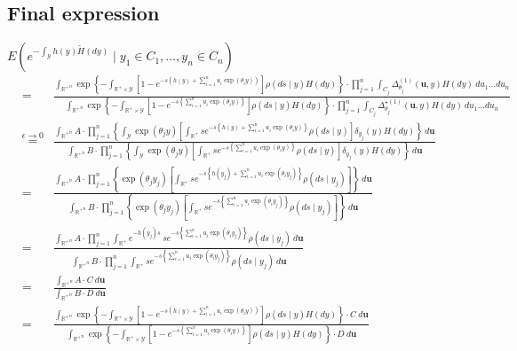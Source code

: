 \documentclass[10pt, oneside]{article}   	%
\renewcommand{\th}{\theta}
\newcommand{\thh}{\widetilde{H}}
\newcommand{\sy}{\mathcal{Y}}
\newcommand{\R}{\mathbb{R}}
\renewcommand{\sy}{\mathcal{Y}}
\newcommand{\ub}{\mathbf{u}}
\begin{document}
\subsection{Final expression}
$E \left(e^{-\int_\sy h(y) \thh(dy)} \mid y_1 \in C_1, \dots, y_n \in C_n\right)$
\begin{eqnarray*}
  & = & \frac{\int_{{\R^{+}}^n}   \exp \left \{ - \int_{\R^{+} \times \sy} \left[1 - e^{- s\left(h(y) + \sum_{i=1}^n u_i \exp(\th_i y)\right)} \right] \rho(ds \mid y) H(dy) \right\} \cdot  \prod_{j=1}^{n}   \int_{C_j}   \Delta^{(1)}_{\th_j} (\ub, y) H(dy) \ d u_1\dots du_n }{\int_{{\R^{+}}^n}   \exp \left \{ - \int_{\R^{+} \times \sy} \left[1 - e^{- s \left\{\sum_{i=1}^n u_i \exp(\th_i y) \right\}} \right] \rho(ds \mid y) H(dy) \right\} \cdot  \prod_{j=1}^{n}   \int_{C_j}  \Delta^{\star (1)}_{\th_j} (\ub, y) H(dy) \ d u_1\dots du_n} \\
  & \stackrel{\epsilon \to 0}{=} & \frac{\int_{{\R^{+}}^n}  A \cdot  \prod_{j=1}^{n} \left\{ \int_\sy \exp (\th_j y)   \left[\int_{\R^{+}} s e^{-s\left\{h(y) + \sum_{i=1}^n u_i \exp(\th_i y)\right\}} \rho(ds \mid y)\right] \delta_{y_j}(y) H(dy) \right\} \ d \ub }{\int_{{\R^{+}}^n}  B  \cdot  \prod_{j=1}^{n}  \left\{ \int_\sy \exp (\th_j y)   \left[\int_{\R^{+}} s e^{-s\left\{\sum_{i=1}^n u_i \exp(\th_i y)\right\}} \rho(ds \mid y)\right] \delta_{y_j}(y) H(dy) \right\} \ d \ub} \\
   & = & \frac{\int_{{\R^{+}}^n}  A \cdot  \prod_{j=1}^{n} \left\{\exp (\th_j y_j)   \left[\int_{\R^{+}} s e^{-s\left\{h(y_j) + \sum_{i=1}^n u_i \exp(\th_i y_j)\right\}} \rho(ds \mid y_j)\right] \right\} \ d \ub }{\int_{{\R^{+}}^n}  B  \cdot  \prod_{j=1}^{n}  \left\{ \exp (\th_j y_j)   \left[\int_{\R^{+}} s e^{-s\left\{\sum_{i=1}^n u_i \exp(\th_i y_j)\right\}} \rho(ds \mid y_j)\right]  \right\} \ d \ub} \\
    & = & \frac{\int_{{\R^{+}}^n}   A \cdot  \prod_{j=1}^{n}  \int_{\R^{+}} e^{- h(y_j) s} \ s e^{-s \left\{\sum_{i=1}^n u_i \exp(\th_i y_j)\right\}} \rho(ds \mid y_j)  \ d \ub }{\int_{{\R^{+}}^n}   B  \cdot  \prod_{j=1}^{n} \int_{\R^{+}} s e^{-s\left\{\sum_{i=1}^n u_i \exp(\th_i y_j)\right\}} \rho(ds \mid y_j) \ d \ub} \\
    & = & \frac{\int_{{\R^{+}}^n} A \cdot C  \ d \ub }{\int_{{\R^{+}}^n}   B  \cdot  D \ d \ub} \\
      & = & \frac{\int_{{\R^{+}}^n}  \exp \left \{ - \int_{\R^{+} \times \sy} \left[1 - e^{- s\left(h(y) + \sum_{i=1}^n u_i \exp(\th_i y)\right)} \right] \rho(ds \mid y) H(dy) \right\} \cdot C  \ d \ub }{\int_{{\R^{+}}^n}   \exp \left \{ - \int_{\R^{+} \times \sy} \left[1 - e^{- s \left\{\sum_{i=1}^n u_i \exp(\th_i y) \right\}} \right] \rho(ds \mid y) H(dy) \right\}  \cdot  D \ d \ub} \\

\end{eqnarray*}
\end{document}
